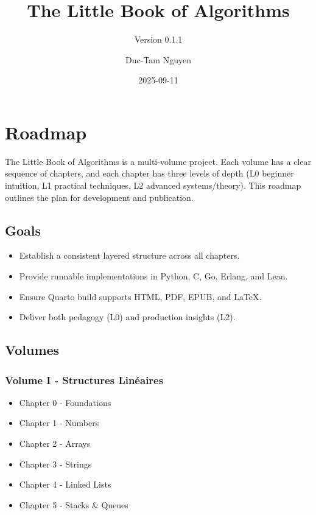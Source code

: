 \documentclass[
  letterpaper,
  DIV=11,
  numbers=noendperiod]{scrreprt}
\title{The Little Book of Algorithms}
\subtitle{Version 0.1.1}
\author{Duc-Tam Nguyen}
\date{2025-09-11}
\providecommand{\tightlist}{%
  \setlength{\itemsep}{0pt}\setlength{\parskip}{0pt}}
\renewcommand*\contentsname{Table of contents}
\newcommand\contentsname{Table of contents}
\begin{document}
\maketitle

\renewcommand*\contentsname{Table of contents}
{
\hypersetup{linkcolor=}
\setcounter{tocdepth}{2}
\tableofcontents
}


\chapter{Roadmap}\label{roadmap}

The Little Book of Algorithms is a multi-volume project. Each volume has
a clear sequence of chapters, and each chapter has three levels of depth
(L0 beginner intuition, L1 practical techniques, L2 advanced
systems/theory). This roadmap outlines the plan for development and
publication.

\section{Goals}\label{goals}

\begin{itemize}
\tightlist
\item
  Establish a consistent layered structure across all chapters.
\item
  Provide runnable implementations in Python, C, Go, Erlang, and Lean.
\item
  Ensure Quarto build supports HTML, PDF, EPUB, and LaTeX.
\item
  Deliver both pedagogy (L0) and production insights (L2).
\end{itemize}

\section{Volumes}\label{volumes}

\subsection{Volume I - Structures
Linéaires}\label{volume-i---structures-linuxe9aires}

\begin{itemize}
\tightlist
\item
  Chapter 0 - Foundations
\item
  Chapter 1 - Numbers
\item
  Chapter 2 - Arrays
\item
  Chapter 3 - Strings
\item
  Chapter 4 - Linked Lists
\item
  Chapter 5 - Stacks \& Queues
\end{itemize}
\end{document}

